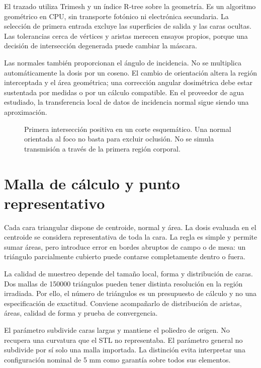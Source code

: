 El trazado utiliza Trimesh y un índice R-tree sobre la geometría. Es un algoritmo geométrico en CPU, sin transporte fotónico ni electrónica secundaria. La selección de primera entrada excluye las superficies de salida y las caras ocultas. Las tolerancias cerca de vértices y aristas merecen ensayos propios, porque una decisión de intersección degenerada puede cambiar la máscara.

Las normales también proporcionan el ángulo de incidencia. No se multiplica automáticamente la dosis por un coseno. El cambio de orientación altera la región interceptada y el área geométrica; una corrección angular dosimétrica debe estar sustentada por medidas o por un cálculo compatible. En el proveedor de agua estudiado, la transferencia local de datos de incidencia normal sigue siendo una aproximación.



\begin{figure}[htbp]\centering
\caption{Primera intersección positiva en un corte esquemático. Una normal orientada al foco no basta para excluir oclusión. No se simula transmisión a través de la primera región corporal.}\label{fig:primera_entrada}\end{figure}

\section{Malla de cálculo y punto representativo}
Cada cara triangular dispone de centroide, normal y área. La dosis evaluada en el centroide se considera representativa de toda la cara. La regla es simple y permite sumar áreas, pero introduce error en bordes abruptos de campo o de mesa: un triángulo parcialmente cubierto puede contarse completamente dentro o fuera.

La calidad de muestreo depende del tamaño local, forma y distribución de caras. Dos mallas de \num{150000} triángulos pueden tener distinta resolución en la región irradiada. Por ello, el número de triángulos es un presupuesto de cálculo y no una especificación de exactitud. Conviene acompañarlo de distribución de aristas, áreas, calidad de forma y prueba de convergencia.

El parámetro  subdivide caras largas y mantiene el poliedro de origen. No recupera una curvatura que el STL no representaba. El parámetro general  no subdivide por sí solo una malla importada. La distinción evita interpretar una configuración nominal de 5 mm como garantía sobre todos sus elementos.



